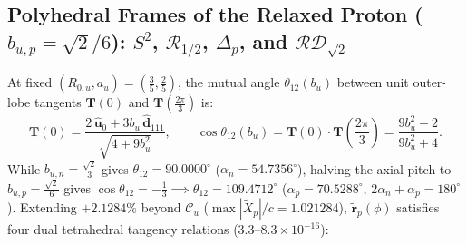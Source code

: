 \documentclass[11pt, a4paper]{article}
\begin{document}
\subsection{\texorpdfstring{Polyhedral Frames of the Relaxed Proton ($b_{u,p} = \sqrt{2}/6$): $S^2$, $\mathcal{R}_{1/2}$, $\Delta_p$, and $\mathcal{RD}_{\sqrt{2}}$}{Polyhedral Frames of the Relaxed Proton}}
At fixed $(R_{0,u}, a_u) = (\frac{3}{5}, \frac{2}{5})$, the mutual angle $\theta_{12}(b_u)$ between unit outer-lobe tangents $\mathbf{T}(0)$ and $\mathbf{T}(\frac{2\pi}{3})$ is:
\begin{equation}
    \mathbf{T}(0) = \frac{2\,\hat{\mathbf{u}}_0 + 3b_u\,\hat{\mathbf{d}}_{111}}{\sqrt{4 + 9b_u^2}}, \qquad
    \cos\theta_{12}(b_u) = \mathbf{T}(0)\cdot\mathbf{T}\!\left(\frac{2\pi}{3}\right) = \frac{9b_u^2 - 2}{9b_u^2 + 4}.
    \label{eq:outer_angle_master}
\end{equation}
While $b_{u,n} = \frac{\sqrt{2}}{3}$ gives $\theta_{12} = \mathbf{90.0000^\circ}$ ($\alpha_n = 54.7356^\circ$), halving the axial pitch to $b_{u,p} = \frac{\sqrt{2}}{6}$ gives $\cos\theta_{12} = -\frac{1}{3} \implies \theta_{12} = \mathbf{109.4712^\circ}$ ($\alpha_p = 70.5288^\circ$, $2\alpha_n + \alpha_p = 180^\circ$). Extending $+2.1284\%$ beyond $\mathcal{C}_u$ ($\max|\tilde{X}_p|/c = 1.021284$), $\tilde{\mathbf{r}}_p(\phi)$ satisfies four dual tetrahedral tangency relations ($3.3\text{--}8.3 \times 10^{-16}$):
\end{document}
